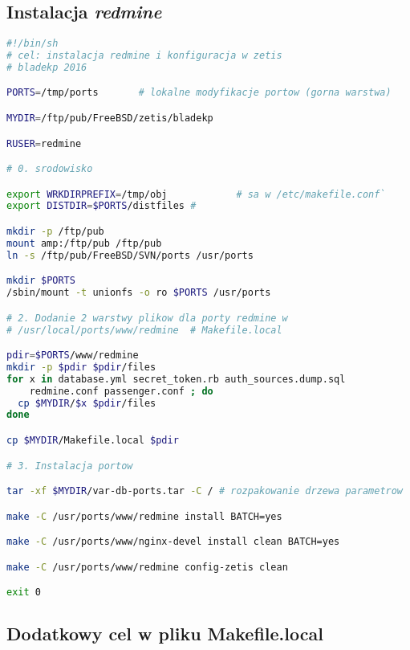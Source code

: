 \documentclass[a4paper,11pt,notitlepage]{article}
\begin{document}
\subsection{Instalacja \textit{redmine}}

\begin{lstlisting}[language=sh,frame=single]
#!/bin/sh
# cel: instalacja redmine i konfiguracja w zetis
# bladekp 2016

PORTS=/tmp/ports       # lokalne modyfikacje portow (gorna warstwa)

MYDIR=/ftp/pub/FreeBSD/zetis/bladekp

RUSER=redmine

# 0. srodowisko

export WRKDIRPREFIX=/tmp/obj            # sa w /etc/makefile.conf`
export DISTDIR=$PORTS/distfiles #

mkdir -p /ftp/pub
mount amp:/ftp/pub /ftp/pub
ln -s /ftp/pub/FreeBSD/SVN/ports /usr/ports

mkdir $PORTS
/sbin/mount -t unionfs -o ro $PORTS /usr/ports

# 2. Dodanie 2 warstwy plikow dla porty redmine w 
# /usr/local/ports/www/redmine  # Makefile.local

pdir=$PORTS/www/redmine
mkdir -p $pdir $pdir/files
for x in database.yml secret_token.rb auth_sources.dump.sql 
	redmine.conf passenger.conf ; do
  cp $MYDIR/$x $pdir/files
done

cp $MYDIR/Makefile.local $pdir

# 3. Instalacja portow

tar -xf $MYDIR/var-db-ports.tar -C / # rozpakowanie drzewa parametrow

make -C /usr/ports/www/redmine install BATCH=yes

make -C /usr/ports/www/nginx-devel install clean BATCH=yes

make -C /usr/ports/www/redmine config-zetis clean

exit 0
\end{lstlisting}

\subsection{Dodatkowy cel w pliku Makefile.local}
\end{document}
